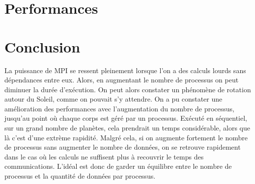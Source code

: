 \documentclass[a4paper,11pt]{article}
\begin{document}
 

\section{Performances}



\section{Conclusion}


La puissance de MPI se ressent pleinement lorsque l'on a des calculs lourds sans dépendances entre eux. Alors, en augmentant le nombre de processus on peut diminuer la durée d'exécution. On peut alors constater un phénomène de rotation autour du Soleil, comme on pouvait s'y attendre. On a pu constater une amélioration des performances avec l'augmentation du nombre de processus, jusqu'au point où chaque corps est géré par un processus. Exécuté en séquentiel, sur un grand nombre de planètes, cela prendrait un temps considérable, alors que là c'est d'une extrème rapidité. Malgré cela, si on augmente fortement le nombre de processus sans augmenter le nombre de données, on se retrouve rapidement dans le cas où les calculs ne suffisent plus à recouvrir le temps des communications. L'idéal est donc de garder un équilibre entre le nombre de processus et la quantité de données par processus.
\end{document}
